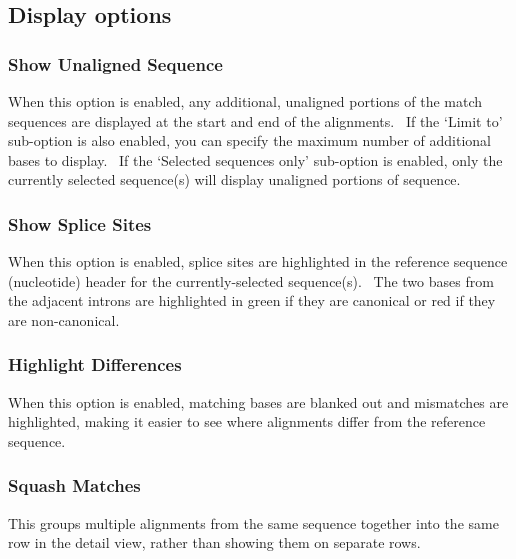 \documentclass[letterpaper]{article}
\begin{document}
\bigskip

{\color[rgb]{0.30980393,0.5058824,0.7411765}\subsection[Display options]{Display options}}
\hypertarget{RefHeading2301056909880}{}
{\color[rgb]{0.30980393,0.5058824,0.7411765}\subsubsection[Show Unaligned
Sequence ]{Show Unaligned Sequence }}
\hypertarget{RefHeading2321056909880}{}{
When this option is enabled, any additional, unaligned portions of the
match sequences are displayed at the start and end of the alignments.
\ If the {\textquoteleft}Limit to{\textquoteright} sub-option is also
enabled, you can specify the maximum number of additional bases to
display. \ If the {\textquoteleft}Selected sequences
only{\textquoteright} sub-option is enabled, only the currently
selected sequence(s) will display unaligned portions of sequence.}

\bigskip

{\color[rgb]{0.30980393,0.5058824,0.7411765}\subsubsection[Show Splice Sites]{Show Splice Sites}}
\hypertarget{RefHeading2341056909880}{}{
When this option is enabled, splice sites are highlighted in the
reference sequence (nucleotide) header for the currently-selected
sequence(s). \ The two bases from the adjacent introns are highlighted
in green if they are canonical or red if they are non-canonical.}

\bigskip

{\color[rgb]{0.30980393,0.5058824,0.7411765}\subsubsection[Highlight Differences]{Highlight Differences}}
\hypertarget{RefHeading2361056909880}{}{
When this option is enabled, matching bases are blanked out and
mismatches are highlighted, making it easier to see where alignments
differ from the reference sequence.}

\bigskip

{\color[rgb]{0.30980393,0.5058824,0.7411765}\subsubsection[Squash Matches ]{Squash Matches }}
\hypertarget{RefHeading2381056909880}{}{
This groups multiple alignments from the same sequence together into the
same row in the detail view, rather than showing them on separate
rows.}
\end{document}
